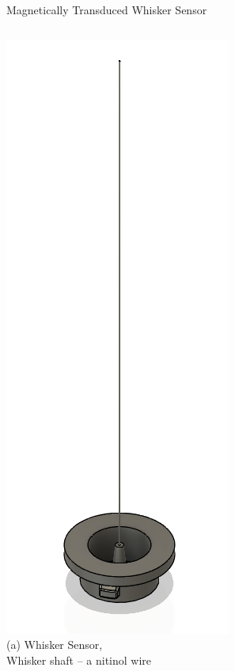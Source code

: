 \documentclass[AIRbeamer
,optEnglish
,optBiber
,optBibstyleAlphabetic
,optBeamerClassicFormat%
]{AIRlatex}
\begin{document}
    \begin{frame}[c]{Magnetically Transduced Whisker Sensor}
        \centering
        \begin{columns}[c,onlytextwidth]
            \centering
            \includegraphics[height=0.6\textheight]{figures/whisker}\\
            (a) Whisker Sensor,\\Whisker shaft -- a nitinol wire
            \centering

\end{columns}
\end{frame}
\end{document}
